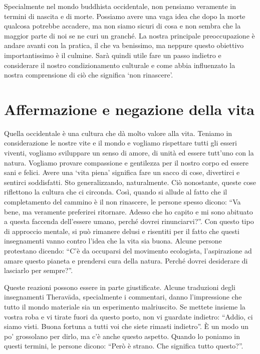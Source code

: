 Specialmente nel mondo buddhista occidentale, non pensiamo veramente in termini di nascita e di morte. Possiamo avere una vaga idea che dopo la morte qualcosa potrebbe accadere, ma non siamo sicuri di cosa e non sembra che la maggior parte di noi se ne curi un granché. La nostra principale preoccupazione è andare avanti con la pratica, il che va benissimo, ma neppure questo obiettivo importantissimo è il culmine. Sarà quindi utile fare un passo indietro e considerare il nostro condizionamento culturale e come abbia influenzato la nostra comprensione di ciò che significa `non rinascere'.

\section*{Affermazione e negazione della vita}

Quella occidentale è una cultura che dà molto valore alla vita. Teniamo in considerazione le nostre vite e il mondo e vogliamo rispettare tutti gli esseri viventi, vogliamo sviluppare un senso di amore, di unità ed essere tutt'uno con la natura. Vogliamo provare compassione e gentilezza per il nostro corpo ed essere sani e felici. Avere una `vita piena' significa fare un sacco di cose, divertirci e sentirci soddisfatti. Sto generalizzando, naturalmente. Ciò nonostante, queste cose riflettono la cultura che ci circonda. Così, quando si allude al fatto che il completamento del cammino è il non rinascere, le persone spesso dicono: ``Va bene, ma veramente preferirei ritornare. Adesso che ho capito e mi sono abituato a questa faccenda dell'essere umano, perché dovrei rinunciarvi?''. Con questo tipo di approccio mentale, si può rimanere delusi e risentiti per il fatto che questi insegnamenti vanno contro l'idea che la vita sia buona. Alcune persone protestano dicendo: ``C'è da occuparsi del movimento ecologista, l'aspirazione ad amare questo pianeta e prendersi cura della natura. Perché dovrei desiderare di lasciarlo per sempre?''.

Queste reazioni possono essere in parte giustificate. Alcune traduzioni degli insegnamenti Theravāda, specialmente i commentari, danno l'impressione che tutto il mondo materiale sia un esperimento malriuscito. Se mettete insieme la vostra roba e vi tirate fuori da questo posto, non vi guardate indietro: ``Addio, ci siamo visti. Buona fortuna a tutti voi che siete rimasti indietro''. È un modo un po' grossolano per dirlo, ma c'è anche questo aspetto. Quando lo poniamo in questi termini, le persone dicono: ``Però è strano. Che significa tutto questo?''.

